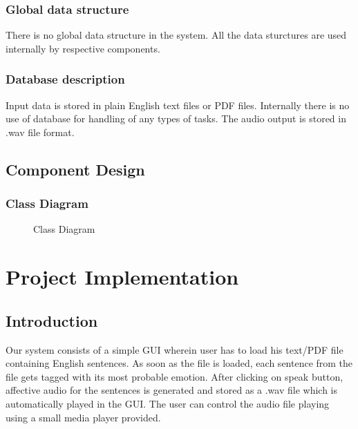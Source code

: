 \documentclass[oneside,a4paper,12pt]{book}
\begin{document}
\subsection{Global data structure}
There is no global data structure in the system. All the data sturctures are used internally by respective components.
\subsection{Database description}
Input data is stored in plain English text files or PDF files. Internally there is no use of database for handling of any types of tasks. The audio output is stored in .wav file format.

\newpage
\section{Component Design} 
\subsection{Class Diagram}
 \begin{center}
	\begin{figure}[!htbp]
		\centering
	  \caption{Class Diagram}
	  \label{fig:class-dig}
	\end{figure}
\end{center} 
 
\chapter{Project Implementation}
  \section{Introduction}
  Our system consists of a simple GUI wherein user has to load his text/PDF file containing English sentences. As soon as the file is loaded, each sentence from the file gets tagged with its most probable emotion. After clicking on speak button, affective audio for the sentences is generated and stored as a .wav file which is automatically played in the GUI. The user can control the audio file playing using a small media player provided.
\end{document}
